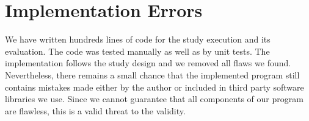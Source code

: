 \section{Implementation Errors}
\label{chp:threats_to_validity:sec:implementation_errors}

We have written hundreds lines of code for the study execution and its evaluation.
The code was tested manually as well as by unit tests.
The implementation follows the study design and we removed all flaws we found.
Nevertheless, there remains a small chance that the implemented program still contains mistakes made either by the author or included in third party software libraries we use.
Since we cannot guarantee that all components of our program are flawless, this is a valid threat to the validity.
